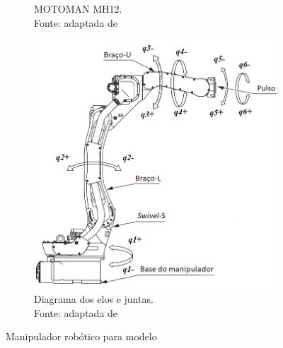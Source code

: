 \begin{figure}[h]
\begin{subfigure}[b]{0.3\textwidth}
        \caption{MOTOMAN MH12. \\Fonte: adaptada de}
        \label{fig::mh12_foto}
    \end{subfigure}
    \quad %
    \begin{subfigure}[b]{0.5\textwidth}
        \includegraphics[width=\textwidth]{figs/mh12_diagram}
        \caption{Diagrama dos elos e juntas. \\Fonte: adaptada de}
        \label{fig::mh12_diagram}
    \end{subfigure}
    \caption{Manipulador robótico para modelo}\label{fig::resumo_mh12}
\end{figure}

